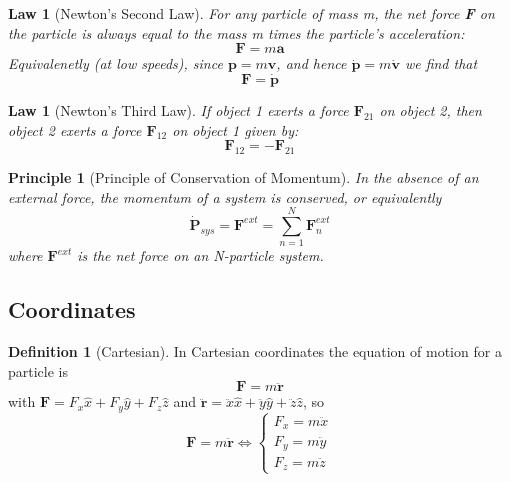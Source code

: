 \documentclass[12pt]{article}
\newtheorem{law}[thm]{Law}
\newtheorem{pri}[thm]{Principle}
\theoremstyle{definition}
\newtheorem{defn}[thm]{Definition}
\theoremstyle{remark}
\numberwithin{equation}{section}
\newcommand\B[1]{\textbf{#1}}
\begin{document}
\begin{law}[Newton's Second Law]
        For any particle of mass m, the net force \textbf{F} on the particle is always equal to the mass m times the particle's acceleration: \begin{equation}
                \B{F} = m\B{a}
        \end{equation}
        Equivalenetly (at low speeds), since $\B{p} = m\B{v}$, and hence $\dot{\B{p}} = m\dot{\B{v}}$ we find that \begin{equation}
                \B{F} = \dot{\B{p}}
        \end{equation}
\end{law}

\vspace{15pt}


\begin{law}[Newton's Third Law]
        If object 1 exerts a force $\B{F}_{21}$ on object 2, then object 2 exerts a force $\B{F}_{12}$ on object 1 given by: \begin{equation}
                \B{F}_{12}=-\B{F}_{21}
        \end{equation}
\end{law}

\vspace{15pt}

\begin{pri}[Principle of Conservation of Momentum]
        In the absence of an external force, the momentum of a system is conserved, or equivalently 
        \begin{equation}
                \dot{\B{P}}_{sys} = \B{F}^{ext} = \sum\limits_{n=1}^{N}\B{F}_n^{ext}
        \end{equation}
        where $\B{F}^{ext}$ is the net force on an N-particle system.
\end{pri}

\vspace{15pt}


\subsection{Coordinates}


\begin{defn}[Cartesian]
        In Cartesian coordinates the equation of motion for a particle is $$\B{F} = m\ddot{\B{r}}$$ with $\B{F} = F_x\hat{x} + F_y\hat{y} + F_z\hat{z}$ and $\ddot{\B{r}} = \ddot{x}\hat{x} + \ddot{y}\hat{y} + \ddot{z}\hat{z}$, so 
        \begin{equation}
                \B{F} = m\ddot{\B{r}} \iff \left\{\begin{array}{c}
                        F_x = m\ddot{x} \\
                        F_y = m\ddot{y} \\
                        F_z = m\ddot{z} 
                \end{array}\right.
        \end{equation}
\end{defn}
\end{document}
